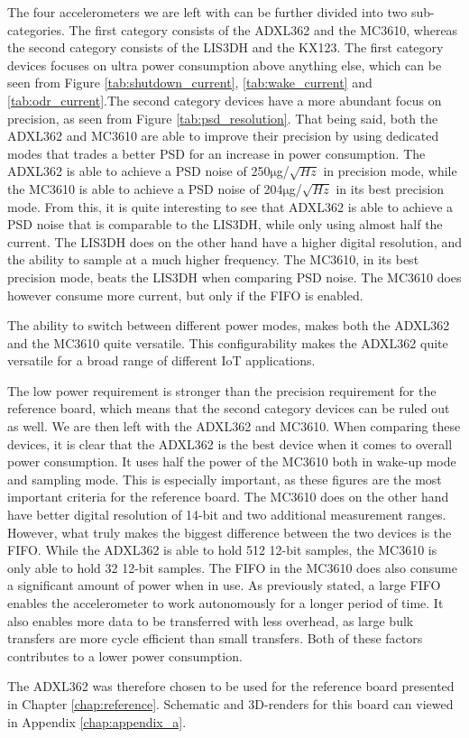The four accelerometers we are left with can be further divided into two sub-categories. The first category consists of the ADXL362 and the MC3610, whereas the second category consists of the LIS3DH and the KX123. The first category devices focuses on ultra power consumption above anything else, which can be seen from Figure \ref{tab:shutdown_current}, \ref{tab:wake_current} and \ref{tab:odr_current}.The second category devices have a more abundant focus on precision, as seen from Figure \ref{tab:psd_resolution}. That being said, both the ADXL362 and MC3610 are able to improve their precision by using dedicated modes that trades a better PSD for an increase in power consumption. The ADXL362 is able to achieve a PSD noise of 250$\si{\micro}$g/$\sqrt{Hz}$ in precision mode, while the MC3610 is able to achieve a PSD noise of 204$\si{\micro}$g/$\sqrt{Hz}$ in its best precision mode. From this, it is quite interesting to see that ADXL362 is able to achieve a PSD noise that is comparable to the LIS3DH, while only using almost half the current. The LIS3DH does on the other hand have a higher digital resolution, and the ability to sample at a much higher frequency. The MC3610, in its best precision mode, beats the LIS3DH when comparing PSD noise. The MC3610 does however consume more current, but only if the FIFO is enabled. 

The ability to switch between different power modes, makes both the ADXL362 and the MC3610 quite versatile. 
This configurability makes the ADXL362 quite versatile for a broad range of different IoT applications.

The low power requirement is stronger than the precision requirement for the reference board, which means that the second category devices can be ruled out as well. We are then left with the ADXL362 and MC3610. When comparing these devices, it is clear that the ADXL362 is the best device when it comes to overall power consumption. It uses half the power of the MC3610 both in wake-up mode and sampling mode. This is especially important, as these figures are the most important criteria for the reference board. The MC3610 does on the other hand have better digital resolution of 14-bit and two additional measurement ranges. However, what truly makes the biggest difference between the two devices is the FIFO. While the ADXL362 is able to hold 512 12-bit samples, the MC3610 is only able to hold 32 12-bit samples. The FIFO in the MC3610 does also consume a significant amount of power when in use. As previously stated, a large FIFO enables the accelerometer to work autonomously for a longer period of time. It also enables more data to be transferred with less overhead, as large bulk transfers are more cycle efficient than small transfers. Both of these factors contributes to a lower power consumption. 

The ADXL362 was therefore chosen to be used for the reference board presented in Chapter \ref{chap:reference}. Schematic and 3D-renders for this board can viewed in Appendix \ref{chap:appendix_a}.